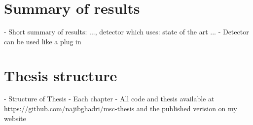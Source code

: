\section{Summary of results}



- Short summary of results: ...,  detector which uses: state of the art ...
- Detector can be used like a plug in

\section{Thesis structure}


- Structure of Thesis
- Each chapter
- All code and thesis available at https://github.com/najibghadri/msc-thesis and the published verision on my website